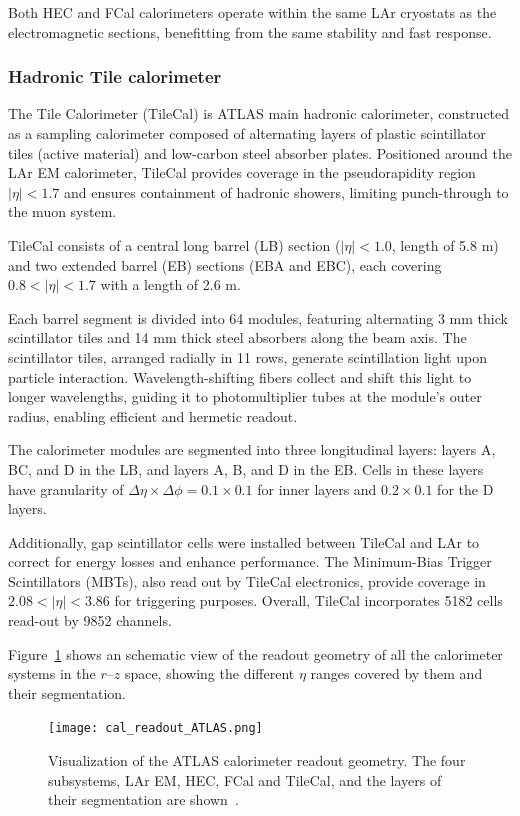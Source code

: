 Both HEC and FCal calorimeters operate within the same LAr cryostats as the electromagnetic sections, benefitting from the same stability and fast response. 

\subsubsection{Hadronic Tile calorimeter}
\label{sec:tilecal}

The Tile Calorimeter (TileCal) is ATLAS main hadronic calorimeter, constructed as a sampling calorimeter composed of alternating layers of plastic scintillator tiles (active material) and low-carbon steel absorber plates. Positioned around the LAr EM calorimeter, TileCal provides coverage in the pseudorapidity region $|\eta|<1.7$ and ensures containment of hadronic showers, limiting punch-through to the muon system.

TileCal consists of a central long barrel (LB) section ($|\eta|<1.0$, length of 5.8 m) and two extended barrel (EB) sections (EBA and EBC), each covering $0.8<|\eta|<1.7$ with a length of 2.6 m.

Each barrel segment is divided into 64 modules, featuring alternating 3 mm thick scintillator tiles and 14 mm thick steel absorbers along the beam axis. The scintillator tiles, arranged radially in 11 rows, generate scintillation light upon particle interaction. Wavelength-shifting fibers collect and shift this light to longer wavelengths, guiding it to photomultiplier tubes at the module's outer radius, enabling efficient and hermetic readout.

The calorimeter modules are segmented into three longitudinal layers: layers A, BC, and D in the LB, and layers A, B, and D in the EB. Cells in these layers have granularity of $\Delta\eta \times \Delta\phi=0.1\times0.1$ for inner layers and $0.2\times0.1$ for the D layers.

Additionally, gap scintillator cells were installed between TileCal and LAr to correct for energy losses and enhance performance. The Minimum-Bias Trigger Scintillators (MBTs), also read out by TileCal electronics, provide coverage in $2.08<|\eta|<3.86$ for triggering purposes. Overall, TileCal incorporates 5182 cells read-out by 9852 channels.

Figure~\ref{fig:cal_resum} shows an schematic view of the readout geometry of all the calorimeter systems in the $r$--$z$ space, showing the different $\eta$ ranges covered by them and their segmentation.
\begin{figure}[htbp]
    \centering
        \texttt{[image: cal\_readout\_ATLAS.png]}
    \caption{Visualization of the ATLAS calorimeter readout geometry. The four subsystems, LAr EM, HEC, FCal and TileCal, and the layers of their segmentation are shown~\cite{Gessinger:2752944}.}
    \label{fig:cal_resum}
\end{figure}

